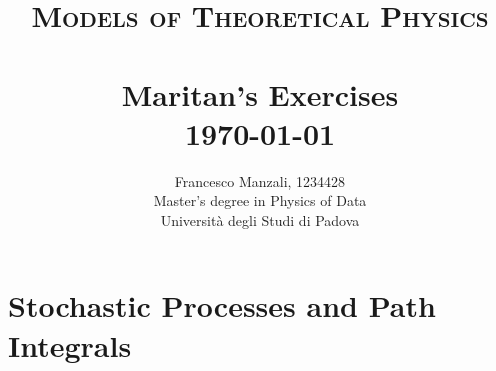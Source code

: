 \documentclass[../template.tex]{subfiles}
\begin{document}
\title{ \normalsize \textsc{Models of Theoretical Physics}
                \\ [2.0cm]
                \HRule{0.5pt} \\
                \LARGE \textbf{{Maritan's Exercises}}
                \HRule{2pt} \\ [0.5cm]
                \normalsize \today \vspace*{5\baselineskip}}

\date{}

\author{
    Francesco Manzali, 1234428\\
    Master's degree in Physics of Data \\ 
    Università degli Studi di Padova}

\maketitle
\tableofcontents
\newpage

\setcounter{chapter}{1}
\chapter{Stochastic Processes and Path Integrals}
\end{document}
